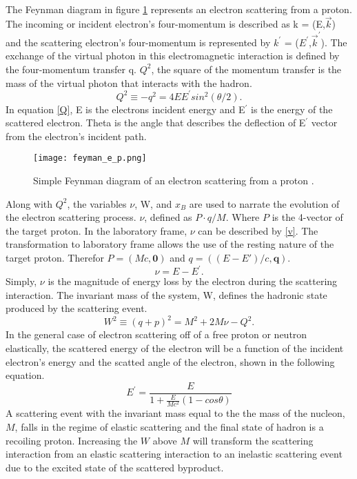 \paragraph{} The Feynman diagram in figure \ref{feynman} represents an electron scattering from a proton. The incoming or incident electron's four-momentum is described as k = (E,$ \vec{k}$) and the scattering electron's four-momentum is represented by $k^\prime{}$ = ($E^\prime{}$,$\vec{k}^\prime{}$). The exchange of the virtual photon in this electromagnetic interaction is defined by the four-momentum transfer q. $Q^2$, the square of the momentum transfer is the mass of the virtual photon that interacts with the hadron. 
\begin{equation}
\label{Q}
Q^2 \equiv -q^2 = 4EE^\prime{} sin^2(\theta/2).
\end{equation} 
In equation \ref{Q}, E is the electrons incident energy and E$^\prime$ is the energy of the scattered electron. Theta is the angle that describes the deflection of E$^\prime$ vector from the electron's incident path. 
\begin{figure}[h]
\centering
\caption{Simple Feynman diagram of an electron scattering from a proton \cite{Flay}.}
\texttt{[image: feyman\_e\_p.png]}
\label{feynman}
\end{figure}
Along with $Q^2$, the variables $\nu$, W, and $x_B$  are used to narrate the evolution of the electron scattering process. $\nu$, defined as $P\cdot q/M$. Where $P$ is the 4-vector of the target proton. In the laboratory frame, $\nu$ can be described by \ref{v}. The transformation to laboratory frame allows the use of the resting nature of the target proton. Therefor $P = (Mc,\boldsymbol{0})$ and $ q = (( E-E\prime)/c,\boldsymbol{q})$. 
\begin{equation}
\label{v}
\nu = E - E^\prime{}.
\end{equation}
Simply, $\nu$ is the magnitude of energy loss by the electron during the scattering interaction. The invariant mass of the system, W,  defines the hadronic state produced by the scattering event. 
\begin{equation}
\label{W}
W^2 \equiv (q + p)^2 = M^2 + 2M\nu -Q^2.
\end{equation}
In the general case of electron scattering off of a free proton or neutron elastically, the scattered energy of the electron will be a function of the incident electron's energy and the scatted angle of the electron, shown in the following equation.
\begin{equation}
E^\prime =\frac{E}{1+\frac{E}{Mc^2}(1-cos\theta)}
\end{equation}
A scattering event with the invariant mass equal to the the mass of the nucleon, $M$, falls in the regime of elastic scattering and the final state of hadron is a recoiling proton. Increasing the $W$ above $M$ will transform the scattering interaction from an elastic scattering interaction to an inelastic scattering event due to the excited state of the scattered byproduct. 
